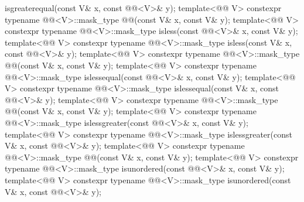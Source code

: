 \begin{itemdecl}
    isgreaterequal(const V& x, const @@<V>& y);
template<@@ V>
  constexpr typename @@<V>::mask_type
    @@(const V& x, const V& y);
template<@@ V>
  constexpr typename @@<V>::mask_type
    isless(const @@<V>& x, const V& y);
template<@@ V>
  constexpr typename @@<V>::mask_type
    isless(const V& x, const @@<V>& y);
template<@@ V>
  constexpr typename @@<V>::mask_type
    @@(const V& x, const V& y);
template<@@ V>
  constexpr typename @@<V>::mask_type
    islessequal(const @@<V>& x, const V& y);
template<@@ V>
  constexpr typename @@<V>::mask_type
    islessequal(const V& x, const @@<V>& y);
template<@@ V>
  constexpr typename @@<V>::mask_type
    @@(const V& x, const V& y);
template<@@ V>
  constexpr typename @@<V>::mask_type
    islessgreater(const @@<V>& x, const V& y);
template<@@ V>
  constexpr typename @@<V>::mask_type
    islessgreater(const V& x, const @@<V>& y);
template<@@ V>
  constexpr typename @@<V>::mask_type
    @@(const V& x, const V& y);
template<@@ V>
  constexpr typename @@<V>::mask_type
    isunordered(const @@<V>& x, const V& y);
template<@@ V>
  constexpr typename @@<V>::mask_type
    isunordered(const V& x, const @@<V>& y);
\end{itemdecl}

